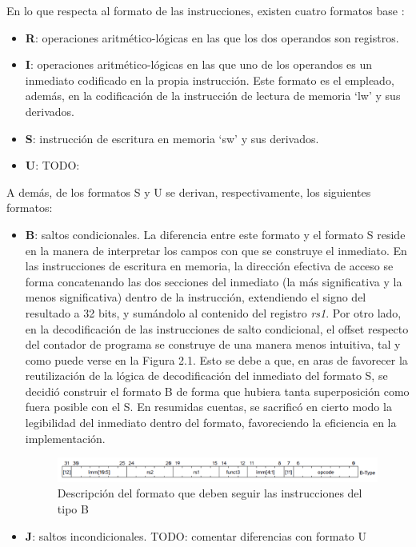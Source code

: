 En lo que respecta al formato de las instrucciones, existen cuatro formatos base \cite{riscv-unpriv-isa-20250508-unpriv-isa-base-instr-formats}:

\begin{itemize}
  \item \textbf{R}: operaciones aritmético-lógicas en las que los dos operandos son registros.
  \vspace{-0.2cm}
  \item \textbf{I}: operaciones aritmético-lógicas en las que uno de los operandos es un inmediato codificado en la propia instrucción. Este formato es el empleado, además, en la codificación de la instrucción de lectura de memoria `lw' y sus derivados.
  \vspace{-0.2cm}
  \item \textbf{S}: instrucción de escritura en memoria `sw' y sus derivados.
  \vspace{-0.2cm}
  \item \textbf{U}: TODO:
\end{itemize}

A demás, de los formatos S y U se derivan, respectivamente, los siguientes formatos\cite{riscv-unpriv-isa-20250508-unpriv-isa-b-j-formats}:

\begin{itemize}
  \item \textbf{B}: saltos condicionales. La diferencia entre este formato y el formato S reside en la manera de interpretar los campos con que se construye el inmediato. En las instrucciones de escritura en memoria, la dirección efectiva de acceso se forma concatenando las dos secciones del inmediato (la más significativa y la menos significativa) dentro de la instrucción, extendiendo el signo del resultado a 32 bits, y sumándolo al contenido del registro \textit{rs1}. Por otro lado, en la decodificación de las instrucciones de salto condicional, el offset respecto del contador de programa se construye de una manera menos intuitiva, tal y como puede verse en la Figura 2.1. Esto se debe a que, en aras de favorecer la reutilización de la lógica de decodificación del inmediato del formato S, se decidió construir el formato B  de forma que hubiera tanta superposición como fuera posible con el S. En resumidas cuentas, se sacrificó en cierto modo la legibilidad del inmediato dentro del formato, favoreciendo la eficiencia en la implementación.
  
\vspace{+0.3cm}
\begin{figure}[h]
  \centering
  \includegraphics[width=0.95 \linewidth]{res/img/formato-b.png}
  \caption{Descripción del formato que deben seguir las instrucciones del tipo B}
\end{figure}

  \vspace{-0.2cm}
  \item \textbf{J}: saltos incondicionales. TODO: comentar diferencias con formato U
\end{itemize}